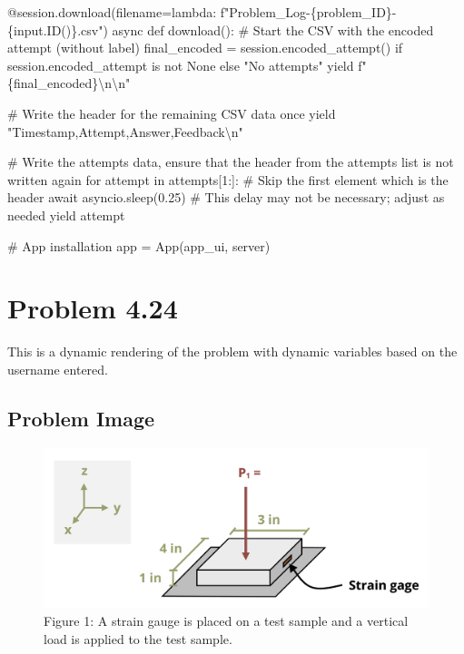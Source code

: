 \documentclass[
  letterpaper,
  DIV=11,
  numbers=noendperiod]{scrreprt}
\newenvironment{Shaded}{\begin{snugshade}}{\end{snugshade}}
\newcommand{\NormalTok}[1]{\textcolor[rgb]{0.00,0.23,0.31}{#1}}
\begin{document}
\begin{Shaded}
\begin{Highlighting}[]
\NormalTok{    @session.download(filename=lambda: f"Problem\_Log{-}\{problem\_ID\}{-}\{input.ID()\}.csv")}
\NormalTok{    async def download():}
\NormalTok{        \# Start the CSV with the encoded attempt (without label)}
\NormalTok{        final\_encoded = session.encoded\_attempt() if session.encoded\_attempt is not None else "No attempts"}
\NormalTok{        yield f"\{final\_encoded\}\textbackslash{}n\textbackslash{}n"}
        
\NormalTok{        \# Write the header for the remaining CSV data once}
\NormalTok{        yield "Timestamp,Attempt,Answer,Feedback\textbackslash{}n"}
        
\NormalTok{        \# Write the attempts data, ensure that the header from the attempts list is not written again}
\NormalTok{        for attempt in attempts[1:]:  \# Skip the first element which is the header}
\NormalTok{            await asyncio.sleep(0.25)  \# This delay may not be necessary; adjust as needed}
\NormalTok{            yield attempt}


\NormalTok{\# App installation}
\NormalTok{app = App(app\_ui, server)}
\end{Highlighting}
\end{Shaded}

\chapter*{Problem 4.24}\label{problem-4.24}


This is a dynamic rendering of the problem with dynamic variables based
on the username entered.

\section*{Problem Image}\label{problem-image-24}


\begin{figure}[H]

{\centering \includegraphics{images/205.png}

}

\caption{Figure 1: A strain gauge is placed on a test sample and a
vertical load is applied to the test sample.}

\end{figure}%
\end{document}
